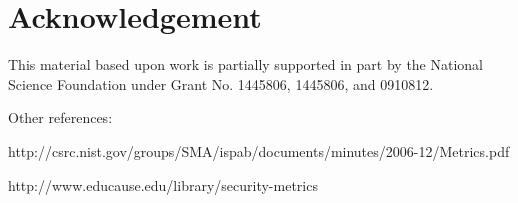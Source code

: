\documentclass{sig-alternate-05-2015}
\begin{document}
 
  
\section{Acknowledgement} 
 
This material based upon work is partially supported in part by the National Science Foundation under Grant No. 1445806, 1445806, and 0910812.


Other references:

http://csrc.nist.gov/groups/SMA/ispab/documents/minutes/2006-12/Metrics.pdf

http://www.educause.edu/library/security-metrics
 
 
% 


 
\end{document}
